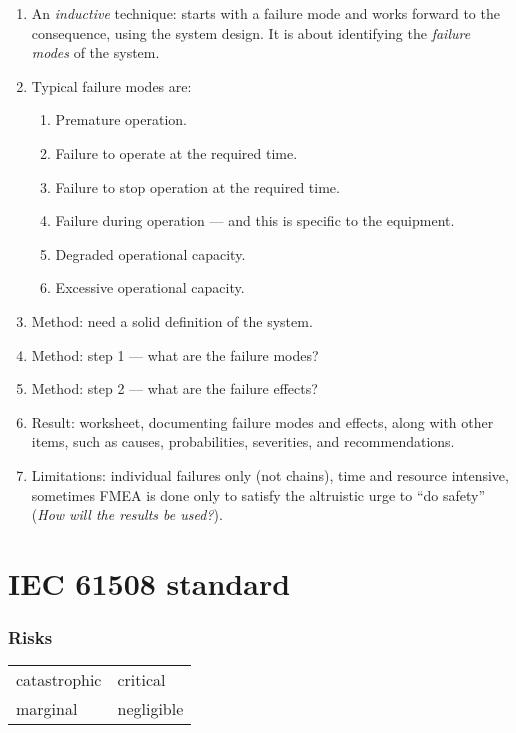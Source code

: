 \documentclass[11pt]{article}
\begin{document}
\begin{enumerate}

  \item An \emph{inductive} technique: starts with a failure mode and works forward to the consequence, using the system design. It is about identifying the \emph{failure modes} of the system.

  \item Typical failure modes are: 

  \begin{enumerate}
  \item Premature operation.
  \item Failure to operate at the required time.
  \item Failure to stop operation at the required time.
  \item Failure during operation --- and this is specific to the equipment.
  \item Degraded operational capacity.
  \item Excessive operational capacity.
  \end{enumerate}

 \item Method: need a solid definition of the system.

 \item Method: step 1 --- what are the failure modes?

 \item Method: step 2 --- what are the failure effects?

 \item Result: worksheet, documenting failure modes and effects, along with other items, such as causes, probabilities, severities, and recommendations. 

 \item Limitations: individual failures only (not chains), time and resource intensive, sometimes FMEA is done only to satisfy the altruistic urge  to ``do safety'' (\emph{How will the results be used?}).

\end{enumerate}

\pagebreak

\section*{IEC  61508 standard}


\subsubsection*{Risks}
      \begin{center}
            \begin{tabular}{ll} 
              catastrophic & critical \\
              marginal     & negligible
            \end{tabular}
        \end{center}
\end{document}
